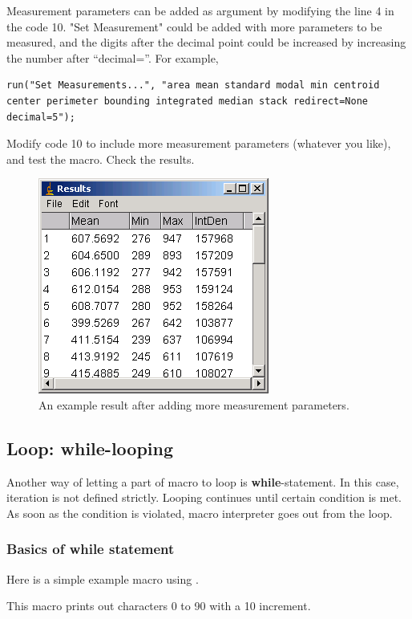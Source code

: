 Measurement parameters can be added as argument by modifying the line 4 in the code 10. "Set Measurement" could be added with more parameters to be measured, and the digits after the decimal point could be increased by increasing the number after ``decimal=''. For example, 
\begin{lstlisting}[numbers=none]
run("Set Measurements...", "area mean standard modal min centroid center perimeter bounding integrated median stack redirect=None decimal=5");
\end{lstlisting}

\begin{indentexercise}{1}
Modify code 10 to include more measurement parameters (whatever you like), and test the macro. Check the results. 
\end{indentexercise}

\begin{figure}[htbp]
\begin{center}
\includegraphics[scale=0.5]{fig/fig2322_moreResultsTable.png}
\caption{An example result after adding more measurement parameters.}
\label{fig_MoreMeasurementPara}
\end{center}
\end{figure} 


\subsection{Loop: while-looping}

Another way of letting a part of macro to loop is \textbf{while}-statement. In this case, iteration is not defined strictly. Looping continues until certain condition is met. As soon as the condition is violated, macro interpreter goes out from the loop.

\subsubsection{Basics of while statement}
Here is a simple example macro using .

This macro prints out characters 0 to 90 with a 10 increment. 

